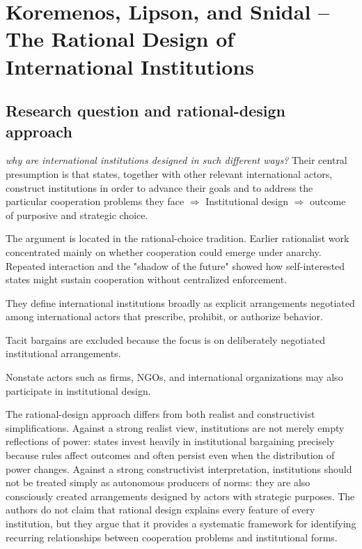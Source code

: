 \clearpage
\section{Koremenos, Lipson, and Snidal -- The Rational Design of International Institutions}

\subsection{Research question and rational-design approach}

\emph{why are international institutions designed in such different ways?} Their central presumption is that states, together with other relevant international actors, construct institutions in order to advance their goals and to address the particular cooperation problems they face $\Rightarrow$ Institutional design $\Rightarrow$ outcome of purposive and strategic choice.

The argument is located in the rational-choice tradition. Earlier rationalist work concentrated mainly on whether cooperation could emerge under anarchy. Repeated interaction and the "shadow of the future" showed how self-interested states might sustain cooperation without centralized enforcement.

They define international institutions broadly as explicit arrangements negotiated among international actors that prescribe, prohibit, or authorize behavior.

Tacit bargains are excluded because the focus is on deliberately negotiated institutional arrangements.

Nonstate actors such as firms, NGOs, and international organizations may also participate in institutional design.

The rational-design approach differs from both realist and constructivist simplifications. Against a strong realist view, institutions are not merely empty reflections of power: states invest heavily in institutional bargaining precisely because rules affect outcomes and often persist even when the distribution of power changes. Against a strong constructivist interpretation, institutions should not be treated simply as autonomous producers of norms: they are also consciously created arrangements designed by actors with strategic purposes. The authors do not claim that rational design explains every feature of every institution, but they argue that it provides a systematic framework for identifying recurring relationships between cooperation problems and institutional forms.

